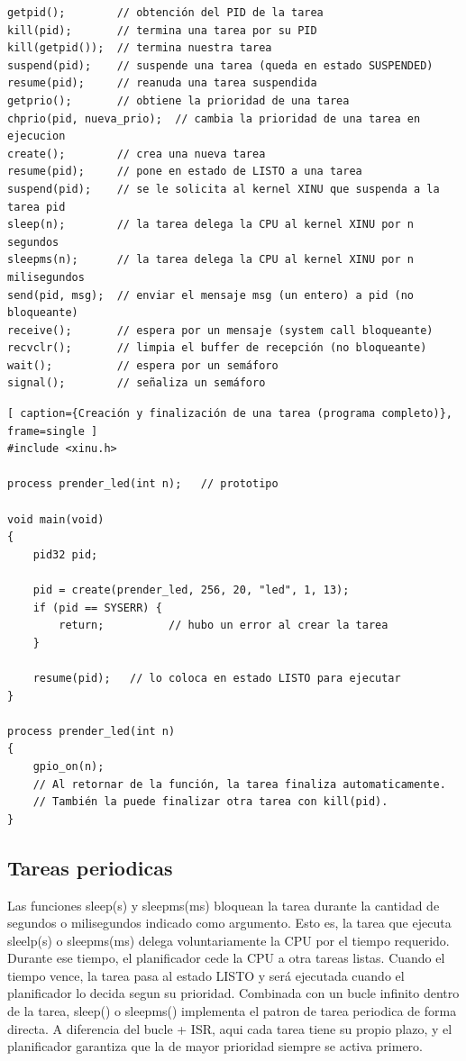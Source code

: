 \documentclass[output=paper, 
colorlinks,
citecolor=brown,
newtxmath
]{langscibook}
\begin{document}
\begin{verbatim}
getpid();        // obtención del PID de la tarea 
kill(pid);       // termina una tarea por su PID
kill(getpid());  // termina nuestra tarea
suspend(pid);    // suspende una tarea (queda en estado SUSPENDED)
resume(pid);     // reanuda una tarea suspendida
getprio();       // obtiene la prioridad de una tarea
chprio(pid, nueva_prio);  // cambia la prioridad de una tarea en ejecucion
create();        // crea una nueva tarea
resume(pid);     // pone en estado de LISTO a una tarea
suspend(pid);    // se le solicita al kernel XINU que suspenda a la tarea pid
sleep(n);        // la tarea delega la CPU al kernel XINU por n segundos
sleepms(n);      // la tarea delega la CPU al kernel XINU por n milisegundos
send(pid, msg);  // enviar el mensaje msg (un entero) a pid (no bloqueante)
receive();       // espera por un mensaje (system call bloqueante)
recvclr();       // limpia el buffer de recepción (no bloqueante)
wait();          // espera por un semáforo
signal();        // señaliza un semáforo
\end{verbatim}

\begin{lstlisting}[ caption={Creación y finalización de una tarea (programa completo)}, frame=single ]
#include <xinu.h>

process prender_led(int n);   // prototipo

void main(void) 
{
    pid32 pid;

    pid = create(prender_led, 256, 20, "led", 1, 13);
    if (pid == SYSERR) {
        return;          // hubo un error al crear la tarea
    }

    resume(pid);   // lo coloca en estado LISTO para ejecutar
}

process prender_led(int n) 
{
    gpio_on(n);
    // Al retornar de la función, la tarea finaliza automaticamente.
    // También la puede finalizar otra tarea con kill(pid).
}
\end{lstlisting}



\subsection{Tareas periodicas}
Las funciones sleep(s) y sleepms(ms) bloquean la tarea durante 
la cantidad de segundos o milisegundos indicado como argumento. 
Esto es, la tarea que ejecuta sleelp(s) o sleepms(ms) delega voluntariamente
la CPU por el tiempo requerido.
Durante ese tiempo, el planificador cede la CPU a otra tareas listas.
Cuando el tiempo vence, la tarea pasa al estado LISTO y será ejecutada
cuando el planificador lo decida segun su prioridad.
Combinada con un bucle infinito dentro de la tarea, sleep() o sleepms() 
implementa el patron de tarea periodica de forma directa. 
A diferencia del bucle + ISR, aqui cada tarea tiene su propio plazo, 
y el planificador garantiza que la de mayor prioridad siempre se activa primero.
\end{document}
